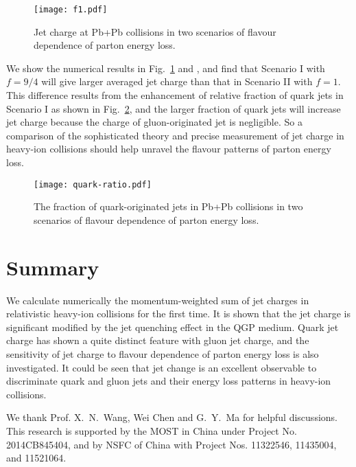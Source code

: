 \documentclass[3p,times,twocolumn]{elsarticle}
\begin{document}
\begin{figure}[!htb]
\texttt{[image: f1.pdf]}
\caption{Jet charge at Pb+Pb collisions in two scenarios of flavour dependence of parton energy loss.}
\label{fig:f1}
\end{figure}




We show the numerical results in Fig.~\ref{fig:f1} and , and find that Scenario I with $f=9/4$ will give larger averaged jet charge than that in Scenario II
with $f=1$. This difference results from the enhancement of relative fraction of quark jets in Scenario I as shown in Fig.~\ref{fig:quark-ratio}, and the larger fraction of quark jets will increase jet charge because the charge of gluon-originated jet is negligible. So a comparison of the sophisticated theory and precise measurement of jet charge in heavy-ion collisions should help unravel the flavour patterns of parton energy loss.


\begin{figure}[!htb]
\texttt{[image: quark-ratio.pdf]}
\caption{The fraction of quark-originated jets in Pb+Pb collisions in two scenarios of flavour dependence of parton energy loss. }
\label{fig:quark-ratio}
\end{figure}

\section{Summary}
\label{sec:summary}

We calculate numerically the momentum-weighted sum of jet charges in relativistic heavy-ion collisions for the first time.
It is shown that the jet charge is significant modified by the jet quenching effect in
the QGP medium. Quark jet charge has shown a quite distinct feature with gluon jet charge, and the sensitivity of jet charge to flavour dependence of parton energy loss is also investigated. It could be seen that jet change is an excellent observable to discriminate quark and gluon jets and their energy loss patterns in heavy-ion collisions.


We thank Prof. X.~N.~Wang, Wei Chen and G.~Y.~Ma for helpful discussions.
This research is supported by the MOST in China under Project No. 2014CB845404, and by NSFC of China with Project Nos. 11322546, 11435004, and 11521064.
\end{document}
